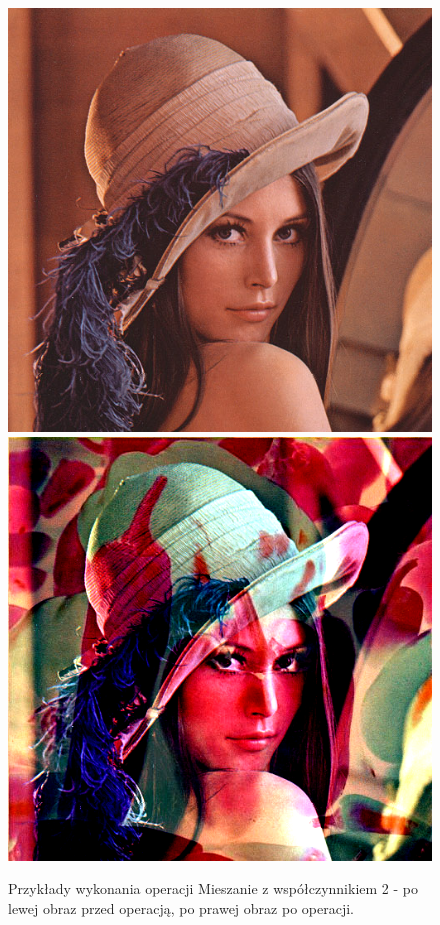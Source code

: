 \documentclass{article}
\begin{document}
\begin{figure}[!htb]
\includegraphics[scale=0.269]{img/lena_24bit.png}  
\includegraphics[scale=0.2]{img/_Mieszanie_Obrazow__lena_24bit_peppers_24bit.png}
\caption{Przykłady wykonania operacji Mieszanie z współczynnikiem 2 - po lewej obraz przed operacją, po prawej obraz po operacji. }
\end{figure}
\end{document}

